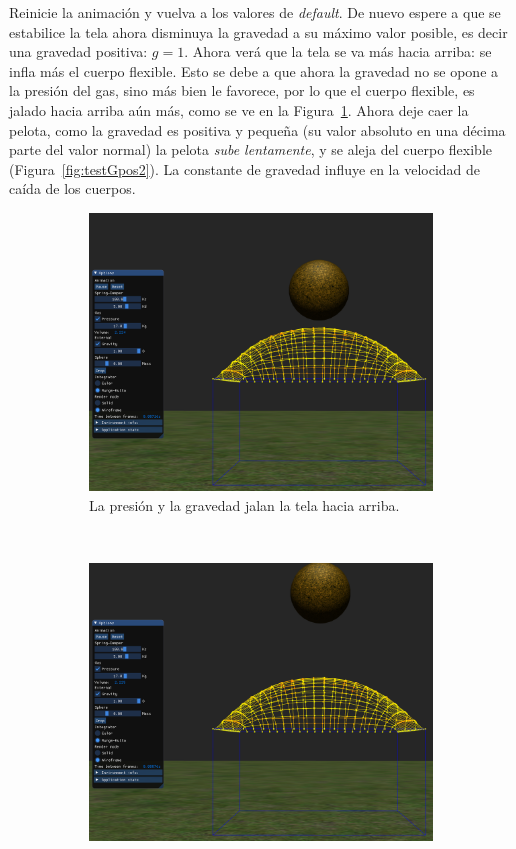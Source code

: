 Reinicie la animación y vuelva a los valores de \emph{\textenglish{default}}.
De nuevo espere a que se estabilice la tela ahora disminuya la gravedad a su máximo valor posible, es decir una gravedad positiva: $g=1$.
Ahora verá que la tela se va más hacia arriba: se infla más el cuerpo flexible. 
Esto se debe a que ahora la gravedad no se opone a la presión del gas, sino más bien le favorece, por lo que el cuerpo flexible, es jalado hacia arriba aún más, como se ve en la Figura~\ref{fig:testGpos1}.
Ahora deje caer la pelota, como la gravedad es positiva y pequeña (su valor absoluto en una décima parte del valor normal) la pelota \emph{sube lentamente}, y se aleja del cuerpo flexible (Figura~\ref{fig:testGpos2}).
La constante de gravedad influye en la velocidad de caída de los cuerpos.

\begin{figure}
 \centering
  \begin{subfigure}[b]{0.45\textwidth}
    \includegraphics[width=\textwidth]{Img/04/positiveGravity1}
    \caption{La presión y la gravedad jalan la tela hacia arriba.}
    \label{fig:testGpos1}
  \end{subfigure}
~
  \begin{subfigure}[b]{0.45\textwidth}
    \includegraphics[width=\textwidth]{Img/04/positiveGravity2}

\end{subfigure}
\end{figure}
